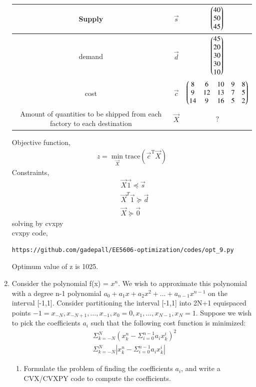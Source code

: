 \documentclass[journal,12pt,twocolumn]{IEEEtran}
\begin{document}
\begin{enumerate}
\begin{table}[H]
{\begin{tabular}{ |c|c|c| }
 \hline
 Supply & $\vec{s}$  &  $\begin{pmatrix}40\\50\\45\end{pmatrix}$ \\ 
 \hline
demand & $\vec{d} $ & $\begin{pmatrix}45\\20\\30\\30\\10\end{pmatrix} $  \\
 \hline
 cost & $\vec{c} $ & $\begin{pmatrix}8&6&10&9&8\\9&12&13&7&5\\14&9&16&5&2\end{pmatrix} $  \\
 \hline
 Amount of quantities to be shipped from each factory to each destination & $\vec{X}$ & $?$\\
 \hline
 \end{tabular}}
 \caption{}
 \end{table}
 Objective function,
 \begin{align}
 z=\min_{\vec{X}} \text{trace}(\vec{c}^\text{T}\vec{X})
 \end{align}
Constraints,
\begin{align}
& \vec{X}\vec{1} \preceq \vec{s}\\
& \vec{X}^T\vec{1} \succeq \vec{d}\\
& \vec{X} \succeq \vec{0}
\end{align}
solving by cvxpy\\
cvxpy code,
\begin{lstlisting}
https://github.com/gadepall/EE5606-optimization/codes/opt_9.py
\end{lstlisting}
Optimum value of z is 1025.
\item Consider the polynomial f(x) = $x^n$. We wish to approximate this polynomial with a degree n-1 polynomial $ a_0 + a_1x + a_2x^2 + . . . + a_{n-1}x^{n-1}$ on the interval [-1,1]. Consider partitioning the interval [-1,1] into 2N+1 equispaced points $-1 = x_{-N} , x_{-N+1}, . . . , x_{-1}, x_0 = 0, x_1, . . . , x_{N-1}, x_N = 1$.
Suppose we wish to pick the coefficients $a_i$ such that the following cost function is minimized:
\begin{align}
&\Sigma_{k=-N}^{N}(x_k^n-\Sigma_{i=0}^{n-1}a_ix_k^i)^2 \nonumber \\
&\Sigma_{k=-N}^{N}|x_k^n-\Sigma_{i=0}^{n-1}a_ix_k^i| \nonumber 
\end{align}
\begin{enumerate}
\item Formulate the problem of finding the coefficients $a_i$, and write a CVX/CVXPY code to compute the coefficients.

\end{enumerate}
\end{enumerate}
\end{document}
